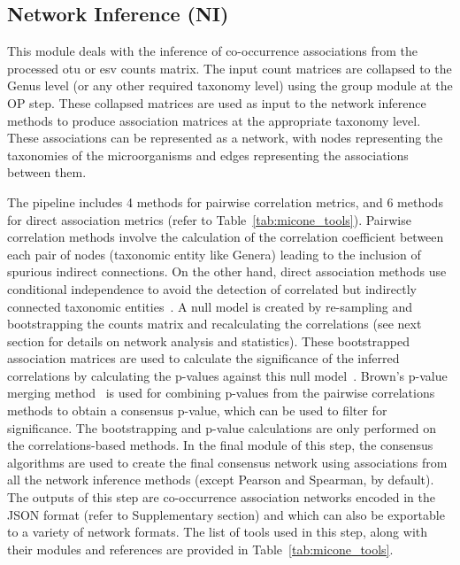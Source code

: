  \subsection*{Network Inference (NI)}
  \vspace{-5mm}
  This module deals with the inference of co-occurrence associations from the processed \ac{otu} or \ac{esv} counts matrix.
  The input count matrices are collapsed to the Genus level (or any other required taxonomy level) using the group module at the OP step.
  These collapsed matrices are used as input to the network inference methods to produce association matrices at the appropriate taxonomy level.
  These associations can be represented as a network, with nodes representing the taxonomies of the microorganisms and edges representing the associations between them.

  The pipeline includes 4 methods for pairwise correlation metrics, and 6 methods for direct association metrics (refer to Table~\ref{tab:micone_tools}).
  Pairwise correlation methods involve the calculation of the correlation coefficient between each pair of nodes (taxonomic entity like Genera) leading to the inclusion of spurious indirect connections.
  On the other hand, direct association methods use conditional independence to avoid the detection of correlated but indirectly connected taxonomic entities~\cite{Kurtz2015,Menon2018}.
  A null model is created by re-sampling and bootstrapping the counts matrix and recalculating the correlations (see next section for details on network analysis and statistics).
  These bootstrapped association matrices are used to calculate the significance of the inferred correlations by calculating the p-values against this null model~\cite{Watts2018}.
  Brown's p-value merging method~\cite{brown_400_1975} is used for combining p-values from the pairwise correlations methods to obtain a consensus p-value, which can be used to filter for significance.
  The bootstrapping and p-value calculations are only performed on the correlations-based methods.
  In the final module of this step, the consensus algorithms are used to create the final consensus network using associations from all the network inference methods (except Pearson and Spearman, by default).
  The outputs of this step are co-occurrence association networks encoded in the JSON format (refer to Supplementary section) and which can also be exportable to a variety of network formats.
  The list of tools used in this step, along with their modules and references are provided in Table~\ref{tab:micone_tools}.

